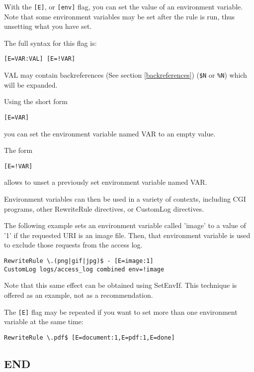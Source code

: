 With the \verb~[E]~, or \verb~[env]~ flag, you can set the value of an environment variable. Note that some environment variables may be set after the rule is run, thus unsetting what you have set.

The full syntax for this flag is:

\begin{verbatim}
[E=VAR:VAL] [E=!VAR]
\end{verbatim}

VAL may contain backreferences (See section \ref{backreferences}) (\verb~$N~ or \verb~%N~) which will be expanded.

Using the short form

\begin{verbatim}
[E=VAR]
\end{verbatim}

you can set the environment variable named VAR to an empty value.

The form

\begin{verbatim}
[E=!VAR]
\end{verbatim}

allows to unset a previously set environment variable named VAR.

Environment variables can then be used in a variety of contexts, including CGI programs, other RewriteRule directives, or CustomLog directives.

The following example sets an environment variable called 'image' to a value of '1' if the requested URI is an image file. Then, that environment variable is used to exclude those requests from the access log.

\begin{verbatim}
RewriteRule \.(png|gif|jpg)$ - [E=image:1]
CustomLog logs/access_log combined env=!image
\end{verbatim}

Note that this same effect can be obtained using SetEnvIf. This technique is offered as an example, not as a recommendation.

The \verb~[E]~ flag may be repeated if you want to set more than one environment variable at the same time:

\begin{verbatim}
RewriteRule \.pdf$ [E=document:1,E=pdf:1,E=done]
\end{verbatim}

\subsection{END}
\label{endflag}

